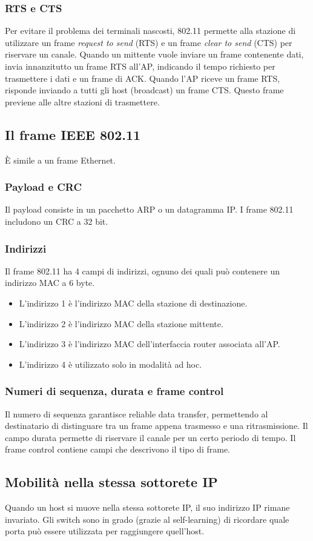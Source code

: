 \documentclass[11pt]{book}
\begin{document}
\subsubsection{RTS e CTS}
Per evitare il problema dei terminali nascosti, 802.11 permette alla stazione di utilizzare un frame \textit{request to
send} (RTS) e un frame \textit{clear to send} (CTS) per riservare un canale. Quando un mittente vuole inviare un frame
contenente dati, invia innanzitutto un frame RTS all'AP, indicando il tempo richiesto per trasmettere i dati e un frame 
di ACK. Quando l'AP riceve un frame RTS, risponde inviando a tutti gli host (broadcast) un frame CTS. Questo frame previene 
alle altre stazioni di trasmettere.
\subsection{Il frame IEEE 802.11}
È simile a un frame Ethernet.
\subsubsection{Payload e CRC}
Il payload consiste in un pacchetto ARP o un datagramma IP. I frame 802.11 includono un CRC a 32 bit.
\subsubsection{Indirizzi}
Il frame 802.11 ha 4 campi di indirizzi, ognuno dei quali può contenere un indirizzo MAC a 6 byte.
\begin{itemize}
    \item L'indirizzo 1 è l'indirizzo MAC della stazione di destinazione.
    \item L'indirizzo 2 è l'indirizzo MAC della stazione mittente.
    \item L'indirizzo 3 è l'indirizzo MAC dell'interfaccia router associata all'AP.
    \item L'indirizzo 4 è utilizzato solo in modalità ad hoc.
\end{itemize} 
\subsubsection{Numeri di sequenza, durata e frame control}
Il numero di sequenza garantisce reliable data transfer, permettendo al destinatario di distinguare tra un frame appena 
trasmesso e una ritrasmissione. Il campo durata permette di riservare il canale per un certo periodo di tempo. Il frame 
control contiene campi che descrivono il tipo di frame.
\subsection{Mobilità nella stessa sottorete IP}
Quando un host si muove nella stessa sottorete IP, il suo indirizzo IP rimane invariato. Gli switch sono in grado (grazie
al self-learning) di ricordare quale porta può essere utilizzata per raggiungere quell'host.
\end{document}
